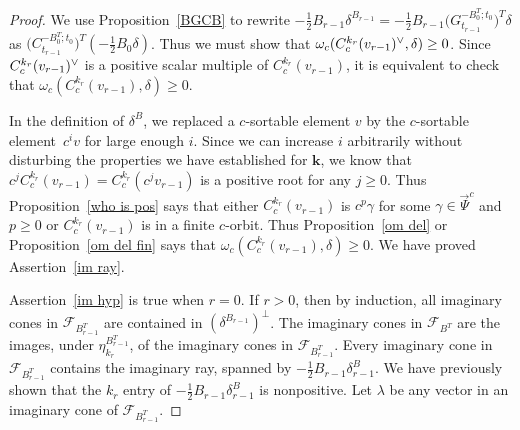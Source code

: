 \documentclass[10pt]{article}
\theoremstyle{definition}
\theoremstyle{remark}
\numberwithin{equation}{section}
\newcommand{\F}{{\mathcal F}}
\newcommand{\ck}{\spcheck}
\newcommand{\0}{{\mathbf{0}}}
\newcommand{\kk}{{\boldsymbol{k}}}
\newcommand{\TravInfChar}{\Psi}
\newcommand{\TravProj}[1]{\overrightarrow{\TravInfChar}^{#1}}
\begin{document}
\begin{proof}
We use Proposition~\ref{BGCB} to rewrite $-\frac12B_{r-1}\delta^{B_{r-1}}=-\frac12B_{r-1}\bigl(G_{t_{r-1}}^{-B_0^T;t_0}\bigr)^T\delta$ as $\bigl(C_{t_{r-1}}^{-B_0^T;t_0}\bigr)^T(-\frac12B_0\delta)$.
Thus we must show that $\omega_c(C^{k_r}_c(v_{r-1})\ck,\delta)\ge0$. 
Since $C^{k_r}_c(v_{r-1})\ck$ is a positive scalar multiple of $C^{k_r}_c(v_{r-1})$, it is equivalent to check that $\omega_c(C^{k_r}_c(v_{r-1}),\delta)\ge0$. 

In the definition of $\delta^B$, we replaced a $c$-sortable element $v$ by the $c$-sortable element~$c^iv$ for large enough $i$.
Since we can increase $i$ arbitrarily without disturbing the properties we have established for $\kk$, we know that $c^jC^{k_r}_c(v_{r-1})=C^{k_r}_c(c^jv_{r-1})$ is a positive root for any $j\ge0$.
Thus Proposition~\ref{who is pos} says that either $C^{k_r}_c(v_{r-1})$ is $c^p\gamma$ for some $\gamma\in\TravProj{c}$ and $p\ge0$ or $C^{k_r}_c(v_{r-1})$ is in a finite $c$-orbit.
Thus Proposition~\ref{om del} or Proposition~\ref{om del fin} says that $\omega_c(C^{k_r}_c(v_{r-1}),\delta)\ge0$. 
We have proved Assertion~\ref{im ray}.

Assertion~\ref{im hyp} is true when $r=0$.
If $r>0$, then by induction, all imaginary cones in $\F_{B_{r-1}^T}$ are contained in $(\delta^{B_{r-1}})^\perp$.
The imaginary cones in $\F_{B^T}$ are the images, under $\eta^{B^T_{r-1}}_{k_r}$, of the imaginary cones in $\F_{B_{r-1}^T}$.
Every imaginary cone in $\F_{B_{r-1}^T}$ contains the imaginary ray, spanned by $-\frac12B_{r-1}\delta^B_{r-1}$.
We have previously shown that the $k_r$ entry of $-\frac12B_{r-1}\delta^B_{r-1}$ is nonpositive.
Let $\lambda$ be any vector in an imaginary cone of $\F_{B_{r-1}^T}$.


\end{proof}
\end{document}
